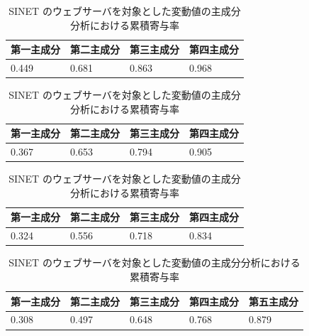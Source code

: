 \documentclass[a4j]{jarticle}
\begin{document}
\begin{table}[tb]
\centering
\caption{AWS サーバを対象とした実測値の主成分分析における累積寄与率}
\label{comp-summary-1}
\begin{tabular}{|l|l|l|l|}
\hline
第一主成分&第二主成分&第三主成分&第四主成分\\
\hline
0.449& 0.681& 0.863& 0.968\\
\hline
\end{tabular}
\caption{AWS サーバを対象とした変動値の主成分分析における累積寄与率}
\begin{tabular}{|l|l|l|l|}
\hline
第一主成分&第二主成分&第三主成分&第四主成分\\
\hline
0.367& 0.653& 0.794& 0.905\\
\hline
\end{tabular}
\caption{SINET のウェブサーバを対象とした実測値の主成分分析における累積寄与率}
\begin{tabular}{|l|l|l|l|}
\hline
第一主成分&第二主成分&第三主成分&第四主成分\\
\hline
0.324& 0.556& 0.718& 0.834\\
\hline
\end{tabular}
\caption{SINET のウェブサーバを対象とした変動値の主成分分析における累積寄与率}
\label{comp-summary-2}
\begin{tabular}{|l|l|l|l|l|}
\hline
第一主成分&第二主成分&第三主成分&第四主成分&第五主成分\\
\hline
0.308& 0.497& 0.648& 0.768&0.879\\
\hline
\end{tabular}
\end{table}
\end{document}
